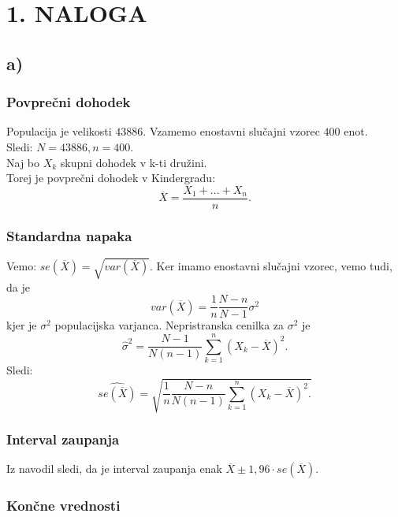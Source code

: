 \documentclass{article}
\begin{document}
\section*{1. NALOGA}
\subsection*{a)}
\subsubsection*{Povprečni dohodek}

Populacija je velikosti $43886$. Vzamemo enostavni slučajni vzorec $400$ enot.\\
Sledi: $N = 43886, n = 400$.\\
Naj bo $X_k$ skupni dohodek v k-ti družini.\\
Torej je povprečni dohodek v Kindergradu: 
\begin{equation*}
\overline{X} = \frac{X_1 + ... + X_n}{n}.
\end{equation*}

\subsubsection*{Standardna napaka}
Vemo: $se( \overline{X} ) = \sqrt{var( \overline{X} )}$. Ker imamo enostavni slučajni vzorec, vemo tudi, da je
\begin{equation*}
var( \overline{X} ) = \frac{1}{n} \frac{N-n}{N-1} \sigma^2
\end{equation*}
kjer je $\sigma^2$ populacijska varjanca. Nepristranska cenilka za $\sigma^2$ je
\begin{equation*}
\hat{\sigma}^2 = \frac{N-1}{N(n-1)} \sum_{k=1}^{n}( X_k - \overline{X} )^2.
\end{equation*}
Sledi:
\begin{equation*}
\widehat{se(\overline{X})} = \sqrt{ \frac{1}{n} \frac{N-n}{N(n-1)} \sum_{k=1}^n (X_k - \overline{X} )^2.
}
\end{equation*}

\subsubsection*{Interval zaupanja}
Iz navodil sledi, da je interval zaupanja enak $\overline{X} \pm 1,96 \cdot se( \overline{X} )$.

\subsubsection*{Končne vrednosti}
\end{document}
